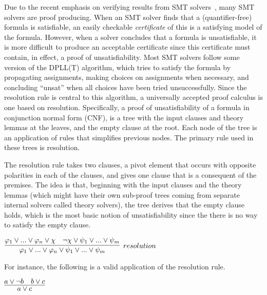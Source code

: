 \documentclass{article}
\begin{document}
		Due to the recent emphasis on verifying results 
		from SMT solvers~\cite{10.1145/1670412.1670413,
		mansur2020detecting, 10.1007/978-3-642-38916-0_3},
		many SMT solvers are proof producing. When an 
		SMT solver finds that a (quantifier-free) formula 
		is satisfiable, an easily checkable 
		\emph{certificate} of this is a satisfying model 
		of the formula.	However, when a solver 
		concludes that a formula is unsatisfiable, it is 
		more difficult to produce an acceptable certificate 
		since this certificate must contain, in effect, 
		a proof of unsatisfiability. Most SMT solvers 
		follow some version of the DPLL(T) algorithm, 
		which tries	to satisfy the formula by propagating assignments, making choices on assignments when necessary, and concluding ``unsat'' when all choices 
		have been tried unsuccessfully. Since the resolution 
		rule is central to this algorithm, a universally 
		accepted proof calculus is one based on resolution. Specifically, a proof of unsatisfiability of a 
		formula in conjunction normal form (CNF), is a 
		tree with the input clauses and theory lemmas at 
		the leaves, and the empty clause at the root. Each 
		node of the tree is an application of rules that simplifies previous nodes. The primary rule used in 
		these trees is resolution.
	
		The resolution rule takes two clauses, a pivot 
		element that occurs with opposite polarities in 
		each of the clauses, and gives one clause that is 
		a consequent of the premises. The idea is that, 
		beginning with the input clauses and the theory 
		lemmas (which might have their own sub-proof trees 
		coming from separate internal solvers called 
		theory solvers), the tree derives that the empty 
		clause holds, which is the most basic notion of unsatisfiability since the there is no way to 
		satisfy the empty clause.
		\begin{center}
			$\infer[resolution]{\varphi_1 \lor ... \lor \varphi_n \lor 
			\psi_1 \lor ... \lor \psi_m}
			{\varphi_1 \lor ... \lor \varphi_n \lor \chi & \neg \chi 
			\lor \psi_1 \lor ... \lor \psi_m}$ 
		\end{center}
		For instance, the following is a valid application 
		of the resolution rule.
		\begin{center}
			$\infer{a \lor c}{a \lor \neg b & b \lor c}$
		\end{center}
	
\end{document}
